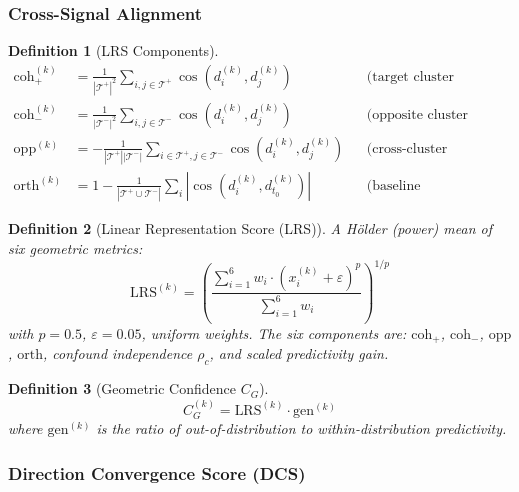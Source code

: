 \documentclass[11pt]{article}
\newtheorem{definition}{Definition}[section]
\begin{document}
\subsubsection{Cross-Signal Alignment}

\begin{definition}[LRS Components]
\begin{align}
\text{coh}^{(k)}_+ &= \frac{1}{|\mathcal{T}^+|^2} \sum_{i,j \in \mathcal{T}^+} \cos(d^{(k)}_i, d^{(k)}_j) & &\text{(target cluster coherence)} \\
\text{coh}^{(k)}_- &= \frac{1}{|\mathcal{T}^-|^2} \sum_{i,j \in \mathcal{T}^-} \cos(d^{(k)}_i, d^{(k)}_j) & &\text{(opposite cluster coherence)} \\
\text{opp}^{(k)} &= -\frac{1}{|\mathcal{T}^+||\mathcal{T}^-|} \sum_{i \in \mathcal{T}^+, j \in \mathcal{T}^-} \cos(d^{(k)}_i, d^{(k)}_j) & &\text{(cross-cluster opposition)} \\
\text{orth}^{(k)} &= 1 - \frac{1}{|\mathcal{T}^+ \cup \mathcal{T}^-|} \sum_{i} \left|\cos(d^{(k)}_i, d^{(k)}_{t_0})\right| & &\text{(baseline orthogonality)}
\end{align}
\end{definition}

\begin{definition}[Linear Representation Score (LRS)]
\label{def:lrs}
A H\"{o}lder (power) mean of six geometric metrics:
\begin{equation}
\text{LRS}^{(k)} = \left(\frac{\sum_{i=1}^6 w_i \cdot (x^{(k)}_i + \varepsilon)^p}{\sum_{i=1}^6 w_i}\right)^{1/p}
\end{equation}
with $p = 0.5$, $\varepsilon = 0.05$, uniform weights. The six components are: $\text{coh}_+$, $\text{coh}_-$, $\text{opp}$, $\text{orth}$, confound independence $\rho_c$, and scaled predictivity gain.
\end{definition}

\begin{definition}[Geometric Confidence $C_G$]
\begin{equation}
C^{(k)}_G = \text{LRS}^{(k)} \cdot \text{gen}^{(k)}
\end{equation}
where $\text{gen}^{(k)}$ is the ratio of out-of-distribution to within-distribution predictivity.
\end{definition}

\subsubsection{Direction Convergence Score (DCS)}
\label{sec:dcs}
\end{document}
